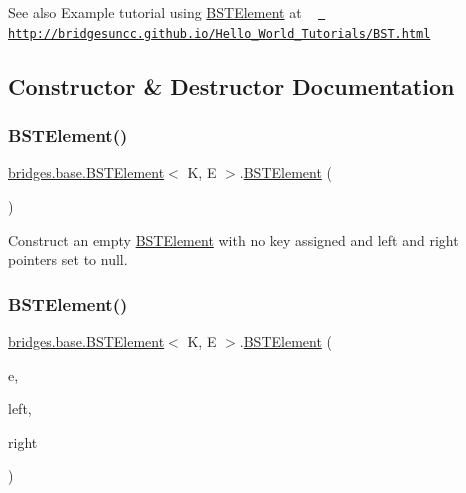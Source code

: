 \begin{DoxySeeAlso}{See also}
Example tutorial using \mbox{\hyperlink{classbridges_1_1base_1_1_b_s_t_element}{B\+S\+T\+Element}} at ~\newline
 \href{http://bridgesuncc.github.io/Hello_World_Tutorials/BST.html}{\texttt{ http\+://bridgesuncc.\+github.\+io/\+Hello\+\_\+\+World\+\_\+\+Tutorials/\+B\+S\+T.\+html}} 
\end{DoxySeeAlso}


\subsection{Constructor \& Destructor Documentation}
\mbox{\label{classbridges_1_1base_1_1_b_s_t_element_a5a557bf3e29e2936c244147c69e04795}} 
\subsubsection{\texorpdfstring{BSTElement()}{BSTElement()}\hspace{0.1cm}{\footnotesize\ttfamily [1/8]}}
{\footnotesize\ttfamily \mbox{\hyperlink{classbridges_1_1base_1_1_b_s_t_element}{bridges.\+base.\+B\+S\+T\+Element}}$<$ K, E $>$.\mbox{\hyperlink{classbridges_1_1base_1_1_b_s_t_element}{B\+S\+T\+Element}} (\begin{DoxyParamCaption}{ }\end{DoxyParamCaption})}

Construct an empty \mbox{\hyperlink{classbridges_1_1base_1_1_b_s_t_element}{B\+S\+T\+Element}} with no key assigned and left and right pointers set to null. \mbox{\label{classbridges_1_1base_1_1_b_s_t_element_a0ec94ad6e2313ada05b48eb83a2f31cb}} 
\subsubsection{\texorpdfstring{BSTElement()}{BSTElement()}\hspace{0.1cm}{\footnotesize\ttfamily [2/8]}}
{\footnotesize\ttfamily \mbox{\hyperlink{classbridges_1_1base_1_1_b_s_t_element}{bridges.\+base.\+B\+S\+T\+Element}}$<$ K, E $>$.\mbox{\hyperlink{classbridges_1_1base_1_1_b_s_t_element}{B\+S\+T\+Element}} (\begin{DoxyParamCaption}\item[{E}]{e,  }\item[{\mbox{\hyperlink{classbridges_1_1base_1_1_b_s_t_element}{B\+S\+T\+Element}}$<$ K, E $>$}]{left,  }\item[{\mbox{\hyperlink{classbridges_1_1base_1_1_b_s_t_element}{B\+S\+T\+Element}}$<$ K, E $>$}]{right }\end{DoxyParamCaption})}

